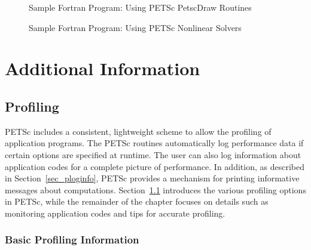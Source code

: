\begin{figure}[H]
{\small
{}
}
\caption{Sample Fortran Program:  Using PETSc PetscDraw Routines}
\label{fig_draw-Fortran}
\end{figure}

\begin{figure}[H]
{\small
{}
}
\caption{Sample Fortran Program:  Using PETSc Nonlinear Solvers}
\label{fig_SNES-Fortran}
\end{figure}

\cleardoublepage
\part{Additional Information}
\label{part_usefulstuff}

\cleardoublepage
\chapter{Profiling}
\label{ch_profiling} 

PETSc includes a consistent, lightweight scheme to allow the profiling
of application programs.  The PETSc routines automatically log
performance data if certain options are specified at runtime.  The
user can also log information about application codes for a complete
picture of performance.  In addition, as described in
Section~\ref{sec_ploginfo}, PETSc provides a mechanism for printing
informative messages about computations.  Section~\ref{sec_profbasic}
introduces the various profiling options in PETSc, while the
remainder of the chapter focuses on details such as monitoring
application codes and tips for accurate profiling.

\section{Basic Profiling Information}
\label{sec_profbasic}
  

